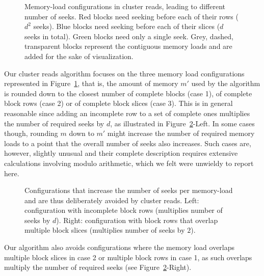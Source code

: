 \documentclass[10pt, conference, compsocconf]{IEEEtran}
\begin{document}
\begin{figure}
\centering
\def\svgwidth{0.3\columnwidth}

\def\svgwidth{0.3\columnwidth}

\def\svgwidth{0.3\columnwidth}

\caption{Memory-load configurations in cluster reads, leading to
  different number of seeks. Red blocks need seeking before each of
  their rows ($d^2$ seeks). Blue blocks need seeking before each of
  their slices ($d$ seeks in total). Green blocks need only a single
  seek. Grey, dashed, transparent blocks represent the contiguous
  memory loads and are added for the sake of visualization.}
\label{fig:cluster-reads}
\end{figure}
Our cluster reads algorithm focuses on the three memory load
configurations represented in Figure~\ref{fig:cluster-reads}, that is,
the amount of memory $m'$ used by the algorithm is rounded down to the
closest number of complete blocks (case 1), of complete block rows (case
2) or of complete block slices (case 3). This is in general reasonable
since adding an incomplete row to a set of complete ones multiplies
the number of required seeks by $d$, as illustrated in
Figure~\ref{fig:avoided-configurations}-Left. In some cases though,
rounding $m$ down to $m'$ might increase the number of required
memory loads to a point that the overall number of seeks also
increases. Such cases are, however, slightly unusual and their
complete description requires extensive calculations involving modulo
arithmetic, which we felt were unwieldy to report here.
\begin{figure}
  \centering
\def\svgwidth{0.3\columnwidth}

\quad \quad \quad
\def\svgwidth{0.3\columnwidth}

\caption{Configurations that increase the number of seeks per
  memory-load and are thus deliberately avoided by cluster
  reads. Left: configuration with incomplete block rows (multiplies
  number of seeks by $d$). Right: configuration with block rows that
  overlap multiple block slices (multiplies number of seeks by $2$).}
\label{fig:avoided-configurations}
\end{figure}

Our algorithm also avoids configurations where the memory load
overlaps multiple block slices in case 2 or multiple block rows in
case 1, as such overlaps multiply the number of required seeks (see
Figure~\ref{fig:avoided-configurations}-Right).
\end{document}
